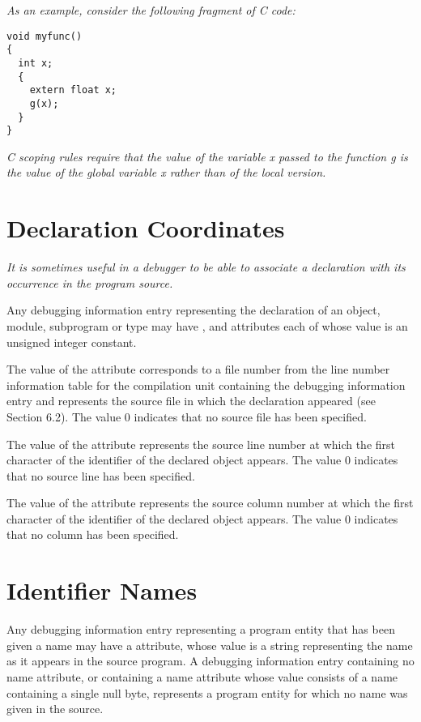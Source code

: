 \textit{As an example, consider the following fragment of C code:}

\begin{lstlisting}
void myfunc()
{
  int x;
  {
    extern float x;
    g(x);
  }
}
\end{lstlisting}


\textit{C scoping rules require that the 
value of the variable x passed to the function g is the value of the
global variable x rather than of the local version.}


\section{Declaration Coordinates}
\label{chap:declarationcoordinates}
\textit{It is sometimes useful in a debugger to be able to associate
a declaration with its occurrence in the program source.
}

Any debugging information entry representing the
declaration of an object, module, subprogram or type may have
,  and 
attributes each of whose value is an unsigned integer constant.

The value of the  attribute corresponds to
a file number from the line number information table for the
compilation unit containing the debugging information entry and
represents the source file in which the declaration appeared
(see Section 6.2). The value 0 indicates that no source file
has been specified.

The value of the  attribute represents
the source line number at which the first character of
the identifier of the declared object appears. The value 0
indicates that no source line has been specified.

The value of the  attribute represents
the source column number at which the first character of
the identifier of the declared object appears. The value 0
indicates that no column has been specified.

\section{Identifier Names}
\label{chap:identifiernames}
Any debugging information entry representing a program entity
that has been given a name may have a  attribute,
whose value is a string representing the name as it appears in
the source program. A debugging information entry containing
no name attribute, or containing a name attribute whose value
consists of a name containing a single null byte, represents
a program entity for which no name was given in the source.

